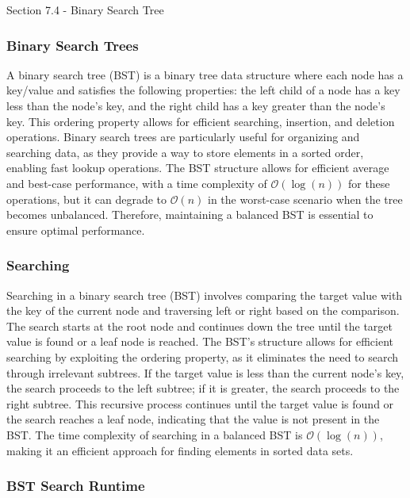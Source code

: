 \begin{notes}{Section 7.4 - Binary Search Tree}
    \subsubsection*{Binary Search Trees}

    A binary search tree (BST) is a binary tree data structure where each node has a key/value and satisfies the following properties: the left child of a node has a key less than the node's key, and the right child has a key greater than the node's key. This ordering property allows for efficient searching, insertion, and 
    deletion operations. Binary search trees are particularly useful for organizing and searching data, as they provide a way to store elements in a sorted order, enabling fast lookup operations. The BST structure allows for efficient average and best-case performance, with a time complexity of $\mathcal{O}(\log{(n)})$ for these operations, but it 
    can degrade to $\mathcal{O}(n)$ in the worst-case scenario when the tree becomes unbalanced. Therefore, maintaining a balanced BST is essential to ensure optimal performance.
    
    \subsubsection*{Searching}
    
    Searching in a binary search tree (BST) involves comparing the target value with the key of the current node and traversing left or right based on the comparison. The search starts at the root node and continues down the tree until the target value is found or a leaf node is reached. The BST's structure allows for efficient searching 
    by exploiting the ordering property, as it eliminates the need to search through irrelevant subtrees. If the target value is less than the current node's key, the search proceeds to the left subtree; if it is greater, the search proceeds to the right subtree. This recursive process continues until the target value is found or 
    the search reaches a leaf node, indicating that the value is not present in the BST. The time complexity of searching in a balanced BST is $\mathcal{O}(\log{(n)})$, making it an efficient approach for finding elements in sorted data sets.
    
    \subsubsection*{BST Search Runtime}
    

\end{notes}
